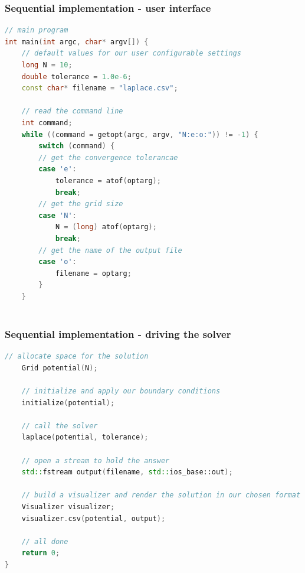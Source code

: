 \begin{frame}[fragile]
%
  \frametitle{Sequential implementation - user interface}
%
  \begin{lstlisting}[language=c++,name=seq:frame,firstnumber=77]
// main program
int main(int argc, char* argv[]) {
    // default values for our user configurable settings
    long N = 10;
    double tolerance = 1.0e-6;
    const char* filename = "laplace.csv";

    // read the command line
    int command;
    while ((command = getopt(argc, argv, "N:e:o:")) != -1) {
        switch (command) {
        // get the convergence tolerancae
        case 'e':
            tolerance = atof(optarg);
            break;
        // get the grid size
        case 'N':
            N = (long) atof(optarg);
            break;
        // get the name of the output file
        case 'o':
            filename = optarg;
        }
    }
    
  \end{lstlisting}
% 
\end{frame}

\begin{frame}[fragile]
%
  \frametitle{Sequential implementation - driving the solver}
%
  \begin{lstlisting}[language=c++,name=seq:frame]
    // allocate space for the solution
    Grid potential(N);

    // initialize and apply our boundary conditions
    initialize(potential);

    // call the solver
    laplace(potential, tolerance);

    // open a stream to hold the answer
    std::fstream output(filename, std::ios_base::out);

    // build a visualizer and render the solution in our chosen format
    Visualizer visualizer;
    visualizer.csv(potential, output);

    // all done
    return 0;
}
  \end{lstlisting}
% 
\end{frame}

